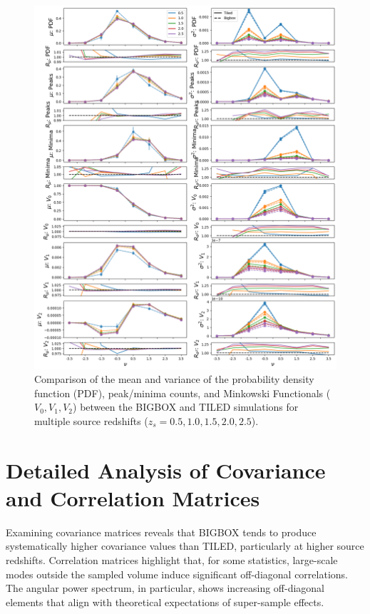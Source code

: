 \begin{figure}[p]
    \centering
    \includegraphics[width=\textwidth]{figures/results/nu_main.png}
    \caption[Comparison of the mean and variance of Non-Correlation Statistics]{Comparison of the mean and variance of the probability density function (PDF), peak/minima counts, and Minkowski Functionals ($V_0, V_1, V_2$) between the BIGBOX and TILED simulations for multiple source redshifts ($z_s = 0.5, 1.0, 1.5, 2.0, 2.5$).}
\end{figure}

\newpage

\section{Detailed Analysis of Covariance and Correlation Matrices}
Examining covariance matrices reveals that BIGBOX tends to produce systematically higher covariance values than TILED, particularly at higher source redshifts. Correlation matrices highlight that, for some statistics, large-scale modes outside the sampled volume induce significant off-diagonal correlations. The angular power spectrum, in particular, shows increasing off-diagonal elements that align with theoretical expectations of super-sample effects.

